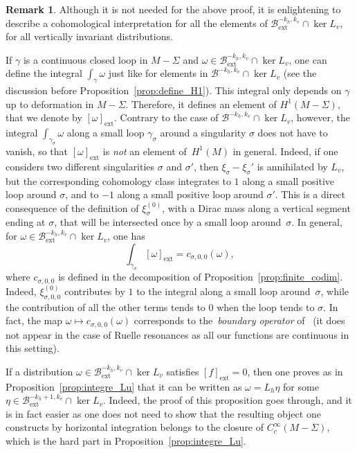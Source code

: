 \documentclass[JEP,XML,SOM,Unicode]{cedram}
\newcommand{\ext}{\mathrm{ext}}
\newcommand{\boB}{\mathcal{B}}
\theoremstyle{definition}
\newtheorem{rmk}[thm]{Remark}
\numberwithin{equation}{section}
\begin{document}
\begin{rmk}
\label{rmk:cohomological} Although it is not needed for the above proof, it
is enlightening to describe a cohomological interpretation for all the
elements of $\boB^{-k_h, k_v}_{\ext} \cap \ker L_v$, \ie for all vertically
invariant distributions.

If $\gamma$ is a continuous closed loop in $M-\Sigma$ and $\omega \in
\boB^{-k_h, k_v}_{\ext} \cap \ker L_v$, one can define the integral
$\int_\gamma \omega$ just like for elements in $\boB^{-k_h, k_v} \cap \ker
L_v$ (see the discussion before Proposition~\ref{prop:define_H1}). This
integral only depends on $\gamma$ up to deformation in $M-\Sigma$. Therefore,
it defines an element of $H^1(M-\Sigma)$, that we denote by $[\omega]_{\ext}$.
Contrary to the case of $\boB^{-k_h, k_v} \cap \ker L_v$, however, the
integral $\int_{\gamma_\sigma} \omega$ along a small loop $\gamma_\sigma$
around a singularity $\sigma$ does not have to vanish, so that
$[\omega]_{\ext}$ is \emph{not} an element of~$H^1(M)$ in general. Indeed, if
one considers two different singularities $\sigma$ and $\sigma'$, then
$\xi_\sigma-\xi_\sigma'$ is annihilated by $L_v$, but the corresponding
cohomology class integrates to $1$ along a small positive loop around
$\sigma$, and to $-1$ along a small positive loop around $\sigma'$. This is a
direct consequence of the definition of $\xi_\sigma^{(0)}$, with a Dirac mass
along a vertical segment ending at $\sigma$, that will be intersected once by
a small loop around~$\sigma$. In general, for $\omega \in \boB^{-k_h,
k_v}_{\ext} \cap \ker L_v$, one has
\begin{equation}
\label{eq:pwuixcvpoiupwoxv}
\int_{\gamma_\sigma} [\omega]_{\ext} = c_{\sigma, 0, 0}(\omega),
\end{equation}
where $c_{\sigma, 0, 0}$ is defined in the decomposition of
Proposition~\ref{prop:finite_codim}. Indeed, $\xi^{(0)}_{\sigma, 0, 0}$
contributes by $1$ to the integral along a small loop around~$\sigma$, while
the contribution of all the other terms tends to $0$ when the loop tends to
$\sigma$. In fact, the map $\omega \mapsto c_{\sigma, 0, 0}(\omega)$ corresponds
to the~\emph{boundary operator} of~\cite{marmi_yoccoz_Holder} (it does not appear
in the case of Ruelle resonances as all our functions are continuous
in this setting).

If a distribution $\omega \in \boB^{-k_h, k_v}_{\ext} \cap \ker L_v$ satisfies
$[f]_{\ext} = 0$, then one proves as in Proposition~\ref{prop:integre_Lu} that
it can be written as $\omega=L_h \eta$ for some $\eta \in \boB_{\ext}^{-k_h+1,
k_v} \cap \ker L_v$. Indeed, the proof of this proposition goes through, and
it is in fact easier as one does not need to show that the resulting object
one constructs by horizontal integration belongs to the closure of
$C_c^\infty(M-\Sigma)$, which is the hard part in
Proposition~\ref{prop:integre_Lu}.


\end{rmk}
\end{document}
